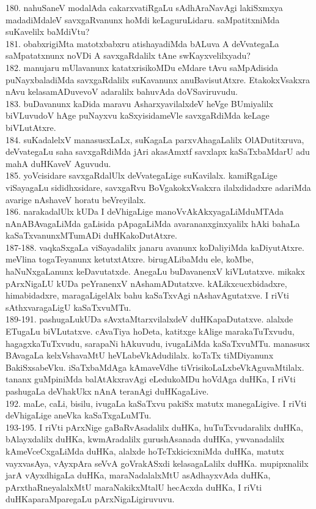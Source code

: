 \documentclass{article}
\begin{document}
180. nahuSaneV modalAda cakarxvatiRgaLu sAdhAraNavAgi lakiSxmxya madadiMdaleV savxgaRvanunx hoMdi keLaguruLidaru. saMpatitxniMda suKavelilx baMdiVtu?\\
181. obabxrigiMta matotxbabxru atishayadiMda bALuva A deVvategaLa saMpatatxnunx noVDi A savxgaRdalilx tAne swKayxvelilxyadu?\\
182. manujaru mUlavanunx katatxrisikoMDu eMdare tAvu saMpAdisida puNayxbaladiMda savxgaRdalilx suKavanunx anuBavisutAtxre. EtakokxVsakxra nAvu kelasamADuvevoV adaralilx bahuvAda doVSaviruvudu.\\
183. buDavanunx kaDida maravu AsharxyavilalxdeV heVge BUmiyalilx biVLuvudoV hAge puNayxvu kaSxyisidameVle savxgaRdiMda keLage biVLutAtxre.\\
184. suKadalelxV manasusxLaLx, suKagaLa parxvAhagaLalilx OlADutitxruva, deVvategaLu saha savxgaRdiMda jAri akasAmxtf savxlapx kaSaTxbaMdarU adu mahA duHKaveV Aguvudu.\\
185. yoVcisidare savxgaRdalUlx deVvategaLige suKavilalx. kamiRgaLige viSayagaLu sididhxsidare, savxgaRvu BoVgakokxVsakxra ilalxdidadxre adariMda avarige nAshaveV horatu beVreyilalx.\\
186. narakadalUlx kUDa I deVhigaLige manoVvAkAkxyagaLiMduMTAda nAnABAvagaLiMda gaLisida pApagaLiMda avarananxginxyalilx hAki bahaLa kaSaTxvanunxMTumADi duHKakoDutAtxre.\\
187-188. vaqkaSxgaLa viSayadalilx janaru avanunx koDaliyiMda kaDiyutAtxre. meVlina togaTeyanunx ketutxtAtxre. birugALibaMdu ele, koMbe, haNuNxgaLanunx keDavutatxde. AnegaLu buDavanenxV kiVLutatxve. mikakx pArxNigaLU kUDa peYranenxV nAshamADutatxve. kALikxcucxbidadxre, himabidadxre, maragaLigelAlx bahu kaSaTxvAgi nAshavAgutatxve. I riVti sAthxvaragaLigU kaSaTxvuMTu.\\
189-191. pashugaLukUDa sAvxtaMtarxvilalxdeV duHKapaDutatxve. alalxde ETugaLu biVLutatxve. cAvaTiya hoDeta, katitxge kAlige marakaTuTxvudu, hagagxkaTuTxvudu, sarapaNi hAkuvudu, ivugaLiMda kaSaTxvuMTu. manasusx BAvagaLa kelxVshavaMtU heVLabeVkAdudilalx. koTaTx tiMDiyanunx BakiSxsabeVku. iSaTxbaMdAga kAmaveVdhe tiVrisikoLaLxbeVkAguvaMtilalx. tananx guMpiniMda balAtAkxravAgi eLedukoMDu hoVdAga duHKa, I riVti pashugaLa deVhakUkx nAnA teranAgi duHKagaLive.\\
192. maLe, caLi, bisilu, ivugaLa kaSaTxvu pakiSx matutx manegaLigive. I riVti deVhigaLige aneVka kaSaTxgaLuMTu.\\
193-195. I riVti pArxNige gaBaRvAsadalilx duHKa, huTuTxvudaralilx duHKa, bAlayxdalilx duHKa, kwmAradalilx gurushAsanada duHKa, ywvanadalilx kAmeVceCxgaLiMda duHKa, alalxde hoTeTxkicicxniMda duHKa, matutx vayxvasAya, vAyxpAra seVvA goVrakASxdi kelasagaLalilx duHKa. mupipxnalilx jarA vAyxdhigaLa duHKa, maraNadalalxMtU asAdhayxvAda duHKa, pArxthaRneyalalxMtU maraNakikxMtalU hecAcxda duHKa, I riVti duHKaparaMparegaLu pArxNigaLigiruvuvu.\\
\end{document}
